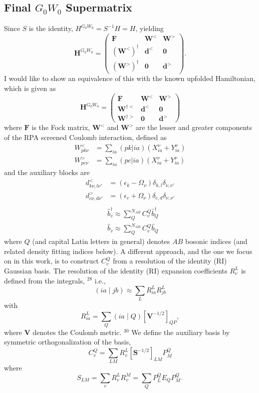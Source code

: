 \subsection*{Final $G_0W_0$ Supermatrix}
Since $S$ is the identity, $H^{G_0W_0}=S^{-1}H=H$, yielding
\[
\mathbf H^{G_0W_0}=
\begin{pmatrix}
\bm F & \bm W^< & \bm W^>\\
(\bm W^<)^\dagger & \bm d^< & \bm0\\
(\bm W^>)^\dagger & \bm0 & \bm d^>
\end{pmatrix}.
\]
I would like to show an equivalence of this with the known upfolded Hamiltonian, which is given as
\begin{equation}
    \bm{H}^{G_0 W_0} = \begin{pmatrix} \bm{F} & \bm{W}^< & \bm{W}^> \\ \bm{W}^{\dagger<} & \bm{d}^< & \bm{0} \\ \bm{W}^{\dagger>} & \bm{0} & \bm{d}^> \end{pmatrix}
\end{equation}
where $\bm{F}$ is the Fock matrix, $\bm{W}^<$ and $\bm{W}^>$ are the lesser and greater components of the RPA screened Coulomb interaction, defined as
\begin{equation}
\begin{split}
    W_{pk\nu}^{<} &= \sum_{ia} (pk|ia) \left( X_{ia}^{\nu} + Y_{ia}^{\nu} \right) \\
    W_{pc\nu}^{>} &= \sum_{ia} (pc|ia) \left( X_{ia}^{\nu} + Y_{ia}^{\nu} \right)
\end{split}
\end{equation}
and the auxiliary blocks are
\begin{equation}
\begin{split}
    d_{k\nu,l\nu'}^{<} &= \left(\epsilon_k - \Omega_\nu\right) \delta_{k,l} \delta_{\nu,\nu'}\\
    d_{c\nu,d\nu'}^{>} &= \left(\epsilon_c + \Omega_\nu\right) \delta_{c,d} \delta_{\nu,\nu'}\\
\end{split}
\end{equation}
$$
\begin{aligned}
& \hat{b}_v^{\dagger} \approx \sum_Q^{N_{A B}} C_v^Q \hat{b}_Q^{\dagger} \\
& \hat{b}_v \approx \sum_Q^{N_{A B}} C_v^Q \hat{b}_Q
\end{aligned}
$$
where $Q$ (and capital Latin letters in general) denotes $A B$ bosonic indices (and related density fitting indices below).
A different approach, and the one we focus on in this work, is to construct $C_v^Q$ from a resolution of the identity (RI) Gaussian basis. The resolution of the identity (RI) expansion coefficients $R_v^L$ is defined from the integrals, ${ }^{28}$ i.e.,
$$
(i a \mid j b) \approx \sum_L R_{i a}^L R_{j b}^L
$$
with
$$
R_{i a}^L=\sum_Q(i a \mid Q)\left[\mathbf{V}^{-1 / 2}\right]_{Q P},
$$
where $\mathbf{V}$ denotes the Coulomb metric. ${ }^{30}$ We define the auxiliary basis by symmetric orthogonalization of the basis,
$$
C_v^Q=\sum_{L M} R_v^L\left[\mathbf{S}^{-1 / 2}\right]_{L M} P_M^Q
$$
where
$$
S_{L M}=\sum_v R_v^L R_v^M=\sum_Q P_L^Q E_Q P_{M^{-}}^Q
$$

